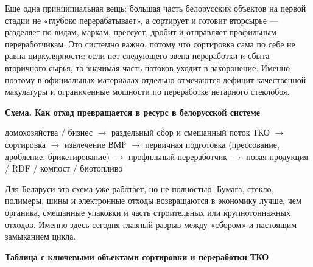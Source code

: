 \documentclass[14pt,a4paper]{extarticle}
\begin{document}
Еще одна принципиальная вещь: большая часть белорусских объектов на первой стадии не «глубоко перерабатывает», а сортирует и готовит вторсырье --- разделяет по видам, маркам, прессует, дробит и отправляет профильным переработчикам. Это системно важно, потому что сортировка сама по себе не равна циркулярности: если нет следующего звена переработки и сбыта вторичного сырья, то значимая часть потоков уходит в захоронение. Именно поэтому в официальных материалах отдельно отмечаются дефицит качественной макулатуры и ограниченные мощности по переработке нетарного стеклобоя.

\textbf{Схема. Как отход превращается в ресурс в белорусской системе}

домохозяйства / бизнес $\rightarrow$ раздельный сбор и смешанный поток ТКО $\rightarrow$ сортировка $\rightarrow$ извлечение ВМР $\rightarrow$ первичная подготовка (прессование, дробление, брикетирование) $\rightarrow$ профильный переработчик $\rightarrow$ новая продукция / RDF / компост / биотопливо

Для Беларуси эта схема уже работает, но не полностью. Бумага, стекло, полимеры, шины и электронные отходы возвращаются в экономику лучше, чем органика, смешанные упаковки и часть строительных или крупнотоннажных отходов. Именно здесь сегодня главный разрыв между «сбором» и настоящим замыканием цикла.

\textbf{Таблица с ключевыми объектами сортировки и переработки ТКО}
\end{document}
